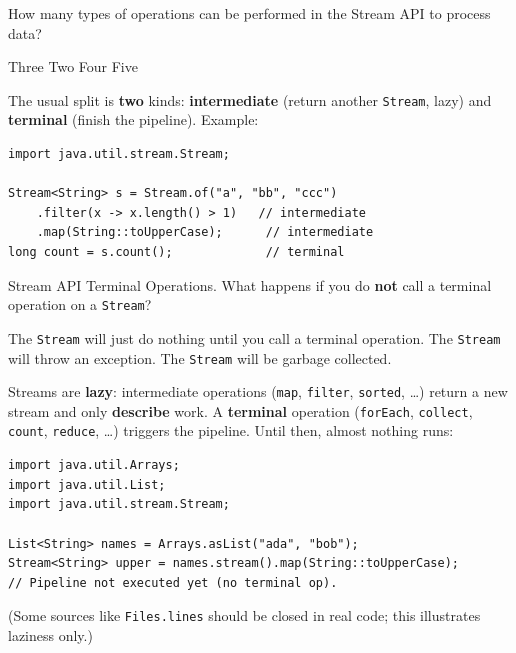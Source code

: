 \question[4]
How many types of operations can be performed in the Stream API to process data?
\begin{choices}
  \choice Three
  \CorrectChoice Two
  \choice Four
  \choice Five
\end{choices}
\begin{solution}
  The usual split is \textbf{two} kinds: \textbf{intermediate} (return another \texttt{Stream}, lazy) and \textbf{terminal} (finish the pipeline). Example:

\begin{lstlisting}[style=java]
import java.util.stream.Stream;

Stream<String> s = Stream.of("a", "bb", "ccc")
    .filter(x -> x.length() > 1)   // intermediate
    .map(String::toUpperCase);      // intermediate
long count = s.count();             // terminal
\end{lstlisting}
\end{solution}

\question[4]
Stream API Terminal Operations. What happens if you do \textbf{not} call a terminal operation on a \texttt{Stream}?
\begin{choices}
  \CorrectChoice The \texttt{Stream} will just do nothing until you call a terminal operation.
  \choice The \texttt{Stream} will throw an exception.
  \choice The \texttt{Stream} will be garbage collected.
\end{choices}
\begin{solution}
  Streams are \textbf{lazy}: intermediate operations (\texttt{map}, \texttt{filter}, \texttt{sorted}, \ldots) return a new stream and only \textbf{describe} work. A \textbf{terminal} operation (\texttt{forEach}, \texttt{collect}, \texttt{count}, \texttt{reduce}, \ldots) triggers the pipeline. Until then, almost nothing runs:

\begin{lstlisting}[style=java]
import java.util.Arrays;
import java.util.List;
import java.util.stream.Stream;

List<String> names = Arrays.asList("ada", "bob");
Stream<String> upper = names.stream().map(String::toUpperCase);
// Pipeline not executed yet (no terminal op).
\end{lstlisting}

  (Some sources like \texttt{Files.lines} should be closed in real code; this illustrates laziness only.)
\end{solution}

